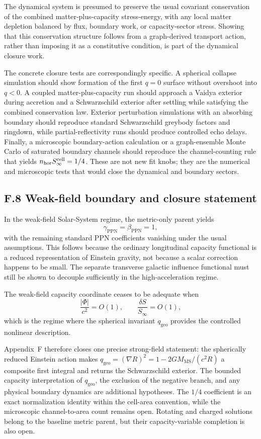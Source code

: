 \documentclass[11pt]{article}
\begin{document}
The dynamical system is presumed to preserve the usual covariant conservation of the combined matter-plus-capacity stress-energy, with any local matter depletion balanced by flux, boundary work, or capacity-sector stress. Showing that this conservation structure follows from a graph-derived transport action, rather than imposing it as a constitutive condition, is part of the dynamical closure work.

The concrete closure tests are correspondingly specific. A spherical collapse simulation should show formation of the first $q=0$ surface without overshoot into $q<0$. A coupled matter-plus-capacity run should approach a Vaidya exterior during accretion and a Schwarzschild exterior after settling while satisfying the combined conservation law. Exterior perturbation simulations with an absorbing boundary should reproduce standard Schwarzschild greybody factors and ringdown, while partial-reflectivity runs should produce controlled echo delays. Finally, a microscopic boundary-action calculation or a graph-ensemble Monte Carlo of saturated boundary channels should reproduce the channel-counting rule that yields $n_{\rm hor}S_\infty^{\rm cell}=1/4$. These are not new fit knobs; they are the numerical and microscopic tests that would close the dynamical and boundary sectors.

\subsection*{F.8 Weak-field boundary and closure statement}

In the weak-field Solar-System regime, the metric-only parent yields
\[
\gamma_{\mathrm{PPN}}=\beta_{\mathrm{PPN}}=1,
\]
with the remaining standard PPN coefficients vanishing under the usual assumptions. This follows because the ordinary longitudinal capacity functional is a reduced representation of Einstein gravity, not because a scalar correction happens to be small. The separate transverse galactic influence functional must still be shown to decouple sufficiently in the high-acceleration regime.

The weak-field capacity coordinate ceases to be adequate when
\[
\frac{|\Phi|}{c^2}=O(1),
\qquad
\frac{\delta S}{S_\infty}=O(1),
\]
which is the regime where the spherical invariant $q_{\mathrm{geo}}$ provides the controlled nonlinear description.

Appendix~F therefore closes one precise strong-field statement: the spherically reduced Einstein action makes $q_{\mathrm{geo}}=(\nabla R)^2=1-2GM_{\mathrm{MS}}/(c^2R)$ a composite first integral and returns the Schwarzschild exterior. The bounded capacity interpretation of $q_{\mathrm{geo}}$, the exclusion of the negative branch, and any physical boundary dynamics are additional hypotheses. The $1/4$ coefficient is an exact normalization identity within the cell-area convention, while the microscopic channel-to-area count remains open. Rotating and charged solutions belong to the baseline metric parent, but their capacity-variable completion is also open.
\end{document}
